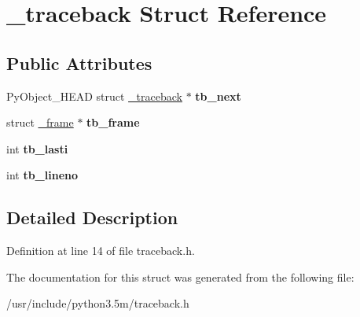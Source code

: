 \hypertarget{struct__traceback}{}\section{\+\_\+traceback Struct Reference}
\label{struct__traceback}
\subsection*{Public Attributes}
\begin{DoxyCompactItemize}
\item 
Py\+Object\+\_\+\+H\+E\+AD struct \hyperlink{struct__traceback}{\+\_\+traceback} $\ast$ {\bfseries tb\+\_\+next}\hypertarget{struct__traceback_a1e0463e0fd57e8164db5b4a07144c020}{}\label{struct__traceback_a1e0463e0fd57e8164db5b4a07144c020}

\item 
struct \hyperlink{struct__frame}{\+\_\+frame} $\ast$ {\bfseries tb\+\_\+frame}\hypertarget{struct__traceback_a53fe070d6b151c9f772793bf85144f38}{}\label{struct__traceback_a53fe070d6b151c9f772793bf85144f38}

\item 
int {\bfseries tb\+\_\+lasti}\hypertarget{struct__traceback_a0248a175c30f2702a3d4386968732d0e}{}\label{struct__traceback_a0248a175c30f2702a3d4386968732d0e}

\item 
int {\bfseries tb\+\_\+lineno}\hypertarget{struct__traceback_a1368fff0890e04dce41ffa6aecb06628}{}\label{struct__traceback_a1368fff0890e04dce41ffa6aecb06628}

\end{DoxyCompactItemize}


\subsection{Detailed Description}


Definition at line 14 of file traceback.\+h.



The documentation for this struct was generated from the following file\+:\begin{DoxyCompactItemize}
\item 
/usr/include/python3.\+5m/traceback.\+h\end{DoxyCompactItemize}
